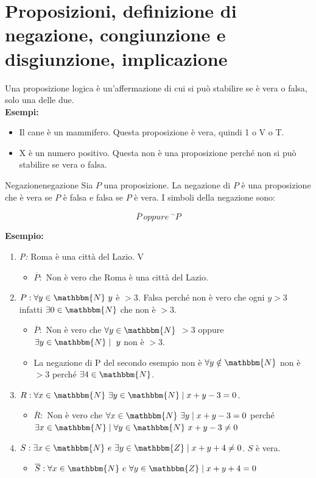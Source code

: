 \documentclass[12pt, letterpaper]{report}
\newcounter{definition}
\newcommand{\nmu}{}
\begin{document}
	\section{Proposizioni, definizione di negazione, congiunzione e disgiunzione, implicazione}
	Una proposizione logica è un'affermazione di cui si può stabilire se è vera o falsa, solo una delle due.
	\\
	\textbf{Esempi: }
	\begin{itemize}
		\item Il cane è un mammifero. Questa proposizione è vera, quindi 1 o V o T.
		\item X è un numero positivo. Questa non è una proposizione perché non si può stabilire se vera o falsa.
	\end{itemize}
	\begin{definition}{\nmu Negazione}{negazione}
		Sia $P$ una proposizione. La negazione di $P$ è una proposizione che è vera se $P$ è falsa e falsa se $P$ è vera.
		I simboli della negazione sono:

		\[
		\overline P \ oppure \ ^\neg P
		\]
	\end{definition}
	\textbf{Esempio: }
	\begin{enumerate}
		\item \textit{P: }Roma è una città del Lazio. V
		\begin{itemize}
			\item $\overline P:$ Non è vero che Roma è una città del Lazio.
		\end{itemize}
		\item $P: \forall y \in \mathbbm{N} \ y $ è $> 3$. Falsa perché non è vero che ogni $y > 3$ infatti $\exists 0 \in \mathbbm{N}$ che non è $> 3$.
		\begin{itemize}
			\item $\overline P:$ Non è vero che $\forall y \in \mathbbm{N}$ $> 3$ oppure $\exists y \in \mathbbm{N} \mid \ y$ non è $> 3$.
			\item La negazione di P del secondo esempio non è $\forall y \notin \mathbbm{N} $ non è $> 3$ perché $\exists 4 \in \mathbbm{N}$.
		\end{itemize}
		\item $R: \forall x \in \mathbbm{N} \ \exists y \in \mathbbm{N} \mid x + y - 3 = 0$.
		\begin{itemize}
			\item $\overline R:$ Non è vero che $\forall x \in \mathbbm{N} \ \exists y \mid x + y - 3 = 0$ perché $\exists x \in \mathbbm{N} \mid \forall y \in \mathbbm{N} \ x + y - 3 \not = 0$
		\end{itemize}
		\item $S: \exists x \in \mathbbm{N} \ e \ \exists y \in \mathbbm{Z} \mid x + y + 4 \not = 0$. $S$ è vera.
		\begin{itemize}
			\item $\overline S: \forall x \in \mathbbm{N} \ e \ \forall y \in \mathbbm{Z} \mid x + y + 4 = 0$
		\end{itemize}
	\end{enumerate}
\end{document}
